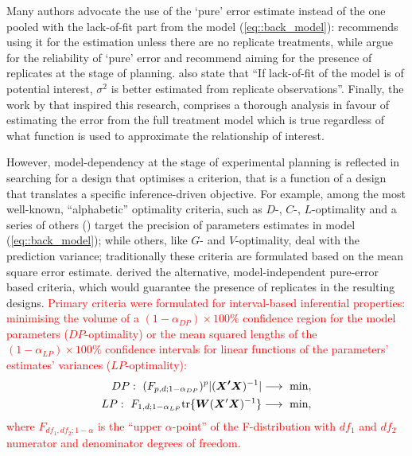 \documentclass[11pt]{article}
\newcommand{\highlight}{\textcolor{red}}
\begin{document}
Many authors advocate the use of the `pure' error estimate instead of the one pooled with the lack-of-fit part from the model (\ref{eq::back_model}): \cite{Cox1958planning} recommends using it for the estimation unless there are no replicate treatments, while \cite{Draper1998} argue for the reliability of `pure' error and recommend aiming for the presence of replicates at the stage of planning. \cite{Atkinson2007} also state that ``If lack-of-fit of the model is of potential interest, $\sigma^{2}$ is better estimated from replicate observations''. Finally, the work by \cite{GilmourTrinca2012} that inspired this research, comprises a thorough analysis in favour of estimating the error from the full treatment model which is true regardless of what function is used to approximate the relationship of interest.


However, model-dependency at the stage of experimental planning is reflected in searching for a design that optimises a criterion, that is a function of a design that translates a specific inference-driven objective. For example, among the most well-known, ``alphabetic'' optimality criteria, such as $D$-, $C$-, $L$-optimality and a series of others (\cite{Atkinson2007}) target the precision of parameters estimates in model (\ref{eq::back_model}); while others, like $G$- and $V$-optimality, deal with the prediction variance; traditionally these criteria are formulated based on the mean square error estimate. \citet{GilmourTrinca2012} derived the alternative, model-independent pure-error based criteria, which would guarantee the presence of replicates in the resulting designs. \highlight{Primary criteria were formulated for interval-based inferential properties: minimising the volume of a $(1-\alpha_{DP})\times 100\%$ confidence region for the model parameters ($DP$-optimality) or the mean squared lengths of the $(1-\alpha_{LP})\times 100\%$ confidence intervals for linear functions of the parameters' estimates' variances ($LP$-optimality):
\begin{align}
\label{DP_LP}
DP: \mbox{  }(F_{p,d;1-\alpha_{DP}})^{p}\vert(\bm{X'}\bm{X})^{-1}\vert &\longrightarrow \mbox{ min}, \\ \notag
LP: \mbox{ }F_{1,d;1-\alpha_{LP}}\mbox{tr}\{\bm{W}(\bm{X}'\bm{X})^{-1}\} &\longrightarrow \mbox{ min},
\end{align}
where $F_{df_1,df_2;1-\alpha}$ is the ``upper $\alpha$-point'' of the F-distribution with $df_1$ and $df_2$ numerator and denominator degrees of freedom.
}
\end{document}
